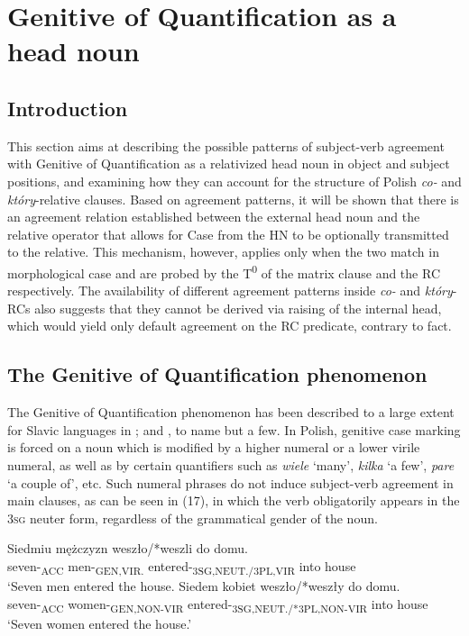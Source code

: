 \documentclass[output=paper]{langsci/langscibook}
\begin{document}
\section{Genitive of Quantification as a head noun} %

\subsection{Introduction}%

This section aims at describing the possible patterns of subject-verb agreement with Genitive of Quantification as a relativized head noun in object and subject positions, and examining how they can account for the structure of Polish \textit{co{}-} and \textit{który}{}-relative clauses. Based on agreement patterns, it will be shown that there is an agreement relation established between the external head noun and the relative operator that allows for Case from the HN to be optionally transmitted to the relative. This mechanism, however, applies only when the two match in morphological case and are probed by the T\textsuperscript{0} of the matrix clause and the RC respectively. The availability of different agreement patterns inside \textit{co{}-} and \textit{który}{}-RCs also suggests that they cannot be derived via raising of the internal head, which would yield only default agreement on the RC predicate, contrary to fact. 

\subsection{The Genitive of Quantification phenomenon}%

The Genitive of Quantification phenomenon has been described to a large extent for Slavic languages in \citet{Bošković2006,Franks1994,Franks2002,Przepiórkowski2004,Rutkowski2002}; and \citet{Willim2003}, to name but a few. In Polish, genitive case marking is forced on a noun which is modified by a higher numeral or a lower virile numeral, as well as by certain quantifiers such as \textit{wiele} ‘many’, \textit{kilka} ‘a few’, \textit{pare} ‘a couple of’, etc. Such numeral phrases do not induce subject-verb agreement in main clauses, as can be seen in (17), in which the verb obligatorily appears in the \textsc{3sg} neuter form, regardless of the grammatical gender of the noun. 

\ea%
    \label{ex:leska:17}
    \ea
    \gll Siedmiu   mężczyzn   weszło/*weszli   do   domu.\\
         seven-\textsubscript{ACC}   men-\textsubscript{GEN,VIR.}   entered-\textsubscript{3SG,NEUT./3PL,VIR} into   house\\
    \glt ‘Seven men entered the house.
    \ex
    \gll Siedem   kobiet   weszło/*weszły      do domu.\\
         seven-\textsubscript{ACC}   women-\textsubscript{GEN,NON-VIR}   entered-\textsubscript{3SG,NEUT./*3PL,NON-VIR} into house\\
    \glt ‘Seven women entered the house.’
    \z
\z
    
\end{document}
